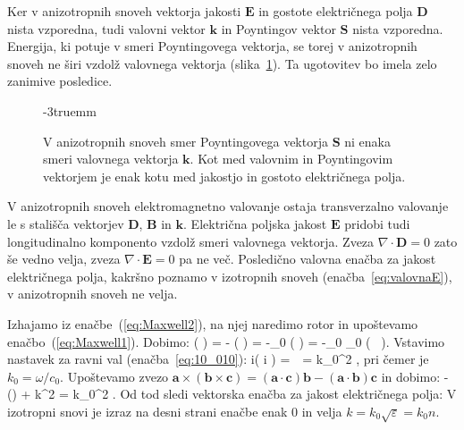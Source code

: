 Ker v anizotropnih snoveh vektorja jakosti $\mathbf{E}$ in gostote električnega 
polja $\mathbf{D}$ nista vzporedna, tudi valovni vektor $\mathbf{k}$ in Poyntingov vektor 
$\mathbf{S}$ nista vzporedna. Energija, ki potuje v smeri Poyntingovega vektorja, se
torej v anizotropnih snoveh ne širi vzdolž valovnega vektorja (slika~\ref{fig:10_koti}). 
Ta ugotovitev bo imela zelo zanimive posledice.
\begin{figure}[!h]
\centering
\def\svgwidth{40truemm} 

\caption{V anizotropnih snoveh smer Poyntingovega 
vektorja $\mathbf{S}$ ni enaka smeri valovnega vektorja $\mathbf{k}$. Kot med 
valovnim in Poyntingovim vektorjem je enak kotu med jakostjo in 
gostoto električnega polja.}
\label{fig:10_koti}
\vglue-3truemm
\end{figure}

V anizotropnih snoveh elektromagnetno valovanje ostaja transverzalno
valovanje le s stališča vektorjev $\mathbf{D}$, $\mathbf{B}$ in 
$\mathbf{k}$. Električna poljska jakost $\mathbf{E}$ pridobi 
tudi longitudinalno komponento vzdolž smeri valovnega vektorja. 
Zveza $\nabla \cdot \mathbf{D} = 0$ zato še vedno velja, zveza 
$\nabla \cdot \mathbf{E} = 0$ pa ne več. Posledično valovna
enačba za jakost električnega polja, kakršno poznamo
v izotropnih snoveh (enačba~\ref{eq:valovnaE}), v anizotropnih snoveh ne velja.

Izhajamo iz enačbe~(\ref{eq:Maxwell2}), na njej naredimo rotor in upoštevamo
enačbo~(\ref{eq:Maxwell1}). Dobimo:
\beq
\nabla \times \left( \nabla \times {} \right) = -  
\left( \nabla \times {} \right) = -\mu_0  
\left( \nabla \times {} \right) = -\mu_0 \varepsilon_0 
 \left( \underline{\varepsilon}\, \right).
\label{eq:10_021}
\eeq
Vstavimo nastavek za ravni val (enačba~\ref{eq:10_010}):
\beq
i\times \left( i  \times {}\right) = 
\,\underline{\varepsilon}\, = 
k_0^2\,\underline{\varepsilon}\,,
\label{eq:10_022}
\eeq
pri čemer je $k_0 = \omega / c_0$. Upoštevamo zvezo $\mathbf{a}\times
\left( \mathbf{b}\times \mathbf{c}\right) = \left(\mathbf{a}\cdot 
\mathbf{c}\right) \mathbf{b} - \left(\mathbf{a}\cdot \mathbf{b}\right) \mathbf{c}$
in dobimo:
\beq
-\left(\cdot {}\right) + k^2  = 
k_0^2\,\underline{\varepsilon}\,.
\label{eq:10_024}
\eeq
Od tod sledi vektorska enačba za jakost električnega polja:
V izotropni snovi je izraz na desni strani enačbe enak 0 
in velja $k = k_0\sqrt{\varepsilon} = k_0 n$. 

